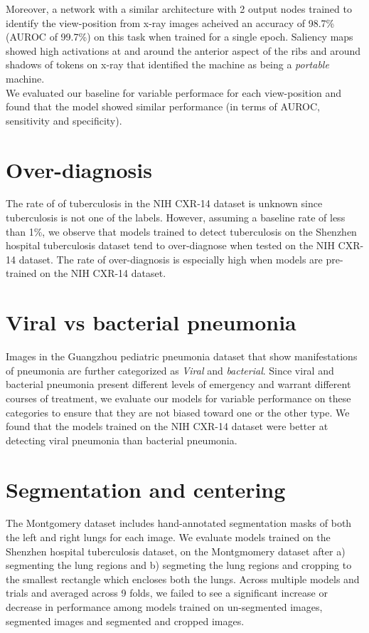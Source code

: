 \documentclass[oneside,a4paper]{article}
\begin{document}
Moreover, a network with a similar architecture with 2 output nodes trained to identify the view-position from x-ray images acheived an accuracy of 98.7\% (AUROC of 99.7\%) on this task when trained for a single epoch. Saliency maps showed high activations at and around the anterior aspect of the ribs and around shadows of tokens on x-ray that identified the machine as being a \emph{portable} machine.\\

We evaluated our baseline for variable performace for each view-position and found that the model showed similar performance (in terms of AUROC, sensitivity and specificity).

\section{Over-diagnosis}
The rate of of tuberculosis in the NIH CXR-14 dataset is unknown since
tuberculosis is not one of the labels. However, assuming a baseline rate of less
than 1\%, we observe that models trained to detect tuberculosis on the Shenzhen
hospital tuberculosis dataset tend to over-diagnose when tested on the NIH
CXR-14 dataset. The rate of over-diagnosis is especially high when models are pre-trained on the
NIH CXR-14 dataset.

\section{Viral vs bacterial pneumonia}
Images in the Guangzhou pediatric pneumonia dataset that show manifestations
of pneumonia are further categorized as \emph{Viral} and \emph{bacterial}.
Since viral and bacterial pneumonia present different levels of emergency and warrant
different courses of treatment, we evaluate our models for variable performance on these
categories to ensure that they are not biased toward one or the other type. We found that the models trained on the NIH CXR-14 dataset were better at
detecting viral pneumonia than bacterial pneumonia.

\section{Segmentation and centering}
The Montgomery dataset includes hand-annotated segmentation masks of both the left and right lungs for each image. We evaluate models trained on the Shenzhen hospital tuberculosis dataset, on the Montgmomery dataset after a) segmenting the lung regions and b) segmeting the lung regions and cropping to the smallest rectangle which encloses both the lungs. Across multiple models and trials and averaged across 9 folds, we failed to see a significant increase or decrease in performance among models trained on un-segmented images, segmented images and segmented and cropped images.
\end{document}
